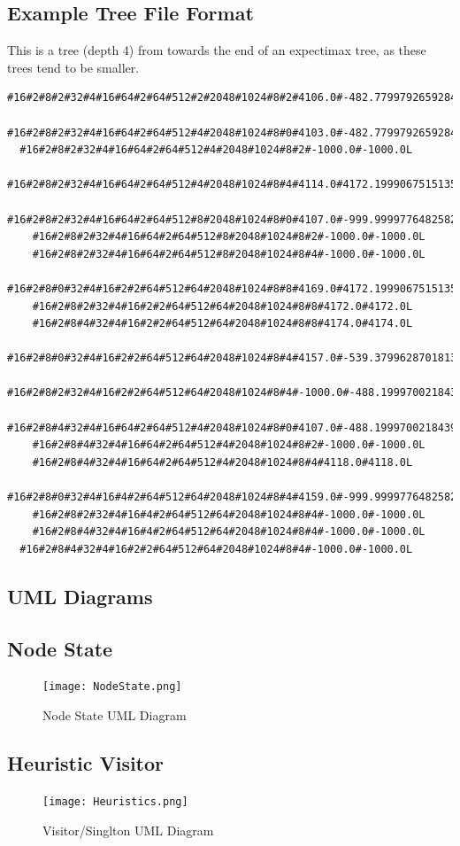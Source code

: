 \documentclass{article}
\begin{document}
\subsection{Example Tree File Format}
\label{subsec:apendixtfile}
This is a tree (depth 4) from towards the end of an expectimax tree, as these trees tend to be smaller.
\begin{verbatim}
#16#2#8#2#32#4#16#64#2#64#512#2#2048#1024#8#2#4106.0#-482.77997926592843M
 #16#2#8#2#32#4#16#64#2#64#512#4#2048#1024#8#0#4103.0#-482.77997926592843C
  #16#2#8#2#32#4#16#64#2#64#512#4#2048#1024#8#2#-1000.0#-1000.0L
  #16#2#8#2#32#4#16#64#2#64#512#4#2048#1024#8#4#4114.0#4172.1999067515135M
   #16#2#8#2#32#4#16#64#2#64#512#8#2048#1024#8#0#4107.0#-999.9999776482582C
    #16#2#8#2#32#4#16#64#2#64#512#8#2048#1024#8#2#-1000.0#-1000.0L
    #16#2#8#2#32#4#16#64#2#64#512#8#2048#1024#8#4#-1000.0#-1000.0L
   #16#2#8#0#32#4#16#2#2#64#512#64#2048#1024#8#8#4169.0#4172.1999067515135C
    #16#2#8#2#32#4#16#2#2#64#512#64#2048#1024#8#8#4172.0#4172.0L
    #16#2#8#4#32#4#16#2#2#64#512#64#2048#1024#8#8#4174.0#4174.0L
 #16#2#8#0#32#4#16#2#2#64#512#64#2048#1024#8#4#4157.0#-539.3799628701813C
  #16#2#8#2#32#4#16#2#2#64#512#64#2048#1024#8#4#-1000.0#-488.1999700218439M
   #16#2#8#4#32#4#16#64#2#64#512#4#2048#1024#8#0#4107.0#-488.1999700218439C
    #16#2#8#4#32#4#16#64#2#64#512#4#2048#1024#8#2#-1000.0#-1000.0L
    #16#2#8#4#32#4#16#64#2#64#512#4#2048#1024#8#4#4118.0#4118.0L
   #16#2#8#0#32#4#16#4#2#64#512#64#2048#1024#8#4#4159.0#-999.9999776482582C
    #16#2#8#2#32#4#16#4#2#64#512#64#2048#1024#8#4#-1000.0#-1000.0L
    #16#2#8#4#32#4#16#4#2#64#512#64#2048#1024#8#4#-1000.0#-1000.0L
  #16#2#8#4#32#4#16#2#2#64#512#64#2048#1024#8#4#-1000.0#-1000.0L

\end{verbatim}
\begin{landscape}
\section{UML Diagrams}
\subsection{Node State}
\label{subsec:apendixns}
\begin{figure}[h]
    \centering
    \texttt{[image: NodeState.png]}
    \caption{Node State UML Diagram}
    \label{fig:my_label}
\end{figure}
\subsection{Heuristic Visitor}
\label{subsec:apendixVS}
\begin{figure}[h]
    \centering
    \texttt{[image: Heuristics.png]}
    \caption{Visitor/Singlton UML Diagram}
    \label{fig:my_label}
\end{figure}
\end{landscape}

\newpage


\end{document}
